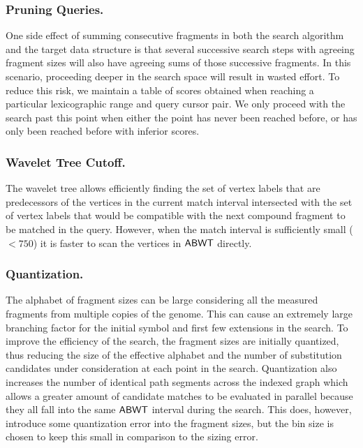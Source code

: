 \subsubsection{Pruning Queries.}

One side effect of summing consecutive fragments in both the search algorithm and the target data structure is that several successive search steps with agreeing fragment sizes will also have agreeing sums of those successive fragments.  In this scenario, proceeding deeper in the search space will result in wasted effort.
To reduce this risk, we maintain a table of scores obtained when reaching a particular lexicographic range and query cursor pair. We only proceed with the search past this point when either the point has never been reached before, or has only been reached before with inferior scores.

\subsubsection{Wavelet Tree Cutoff.}
The wavelet tree allows efficiently finding the set of vertex labels that are predecessors of the vertices in the current match interval intersected with the set of vertex labels that would be compatible with the next compound fragment to be matched in the query.  However, when the match interval is sufficiently small ($ < 750 $) it is faster to scan the vertices in $\mbox{\rm {\sf ABWT}}$ directly.

\subsubsection{Quantization.}
The alphabet of fragment sizes can be large considering all the measured fragments from multiple copies of the genome.  This can cause an extremely large branching factor for the initial symbol and first few extensions in the search.  To improve the efficiency of the search, the fragment sizes are initially quantized, thus reducing the size of the effective alphabet and the number of \mbox{substitution} candidates under consideration at each point in the search.  Quantization also increases the number of identical path segments across the indexed graph which allows a greater amount of candidate matches to be evaluated in parallel because they all fall into the same $\mbox{\rm {\sf ABWT}}$ interval during the search.  This does, however, introduce some quantization error into the fragment sizes, but the bin size is chosen to keep this small in comparison to the sizing error.


